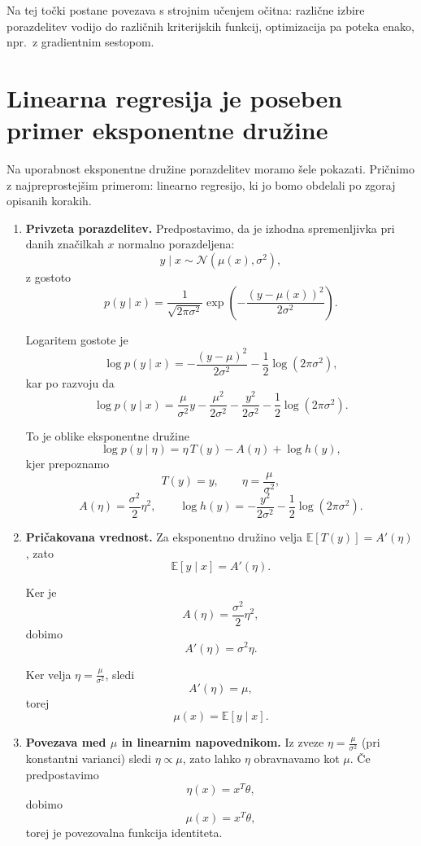Na tej točki postane povezava s strojnim učenjem očitna: različne izbire porazdelitev vodijo do različnih kriterijskih funkcij, optimizacija pa poteka enako, npr.\ z gradientnim sestopom.

\section{Linearna regresija je poseben primer eksponentne družine}

Na uporabnost eksponentne družine porazdelitev moramo šele pokazati.
Pričnimo z najpreprostejšim primerom: linearno regresijo, ki jo bomo
obdelali po zgoraj opisanih korakih.

\begin{enumerate}

\item \textbf{Privzeta porazdelitev.}
Predpostavimo, da je izhodna spremenljivka pri danih značilkah $x$
normalno porazdeljena:
\[
y \mid x \sim \mathcal{N}(\mu(x), \sigma^2),
\]
z gostoto
\[
p(y \mid x) = \frac{1}{\sqrt{2\pi\sigma^2}}
\exp\!\left(-\frac{(y - \mu(x))^2}{2\sigma^2}\right).
\]

Logaritem gostote je
\[
\log p(y \mid x) =
-\frac{(y - \mu)^2}{2\sigma^2}
- \frac{1}{2}\log(2\pi\sigma^2),
\]
kar po razvoju da
\[
\log p(y \mid x)
= \frac{\mu}{\sigma^2} y
- \frac{\mu^2}{2\sigma^2}
- \frac{y^2}{2\sigma^2}
- \frac{1}{2}\log(2\pi\sigma^2).
\]

To je oblike eksponentne družine
\[
\log p(y \mid \eta)
= \eta\,T(y) - A(\eta) + \log h(y),
\]
kjer prepoznamo
\[
T(y)=y, \qquad
\eta = \frac{\mu}{\sigma^2},
\]
\[
A(\eta) = \frac{\sigma^2}{2}\eta^2, \qquad
\log h(y)= -\frac{y^2}{2\sigma^2} - \frac{1}{2}\log(2\pi\sigma^2).
\]

\item \textbf{Pričakovana vrednost.}
Za eksponentno družino velja $\mathbb{E}[T(y)] = A'(\eta)$, zato
\[
\mathbb{E}[y \mid x] = A'(\eta).
\]

Ker je
\[
A(\eta) = \frac{\sigma^2}{2}\eta^2,
\]
dobimo
\[
A'(\eta) = \sigma^2 \eta.
\]

Ker velja $\eta = \frac{\mu}{\sigma^2}$, sledi
\[
A'(\eta) = \mu,
\]
torej
\[
\mu(x) = \mathbb{E}[y \mid x].
\]

\item \textbf{Povezava med $\mu$ in linearnim napovednikom.}
Iz zveze $\eta = \frac{\mu}{\sigma^2}$ (pri konstantni varianci)
sledi $\eta \propto \mu$, zato lahko $\eta$ obravnavamo kot $\mu$.
Če predpostavimo
\[
\eta(x) = x^T\theta,
\]
dobimo
\[
\mu(x) = x^T\theta,
\]
torej je povezovalna funkcija identiteta.


\end{enumerate}
